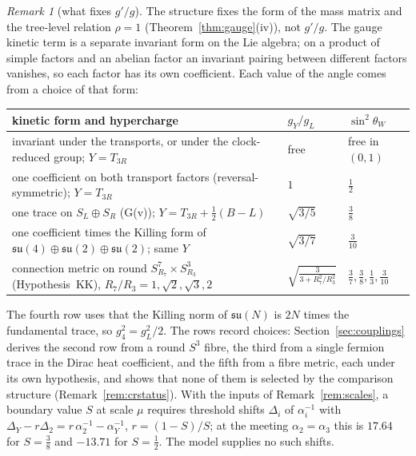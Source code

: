 \documentclass[aps,pra,onecolumn,superscriptaddress,nofootinbib,10pt]{revtex4-2}
\theoremstyle{definition}
\theoremstyle{remark}
\newtheorem{remark}[theorem]{Remark}
\newcommand{\su}{\mathfrak{su}}
\begin{document}
\begin{remark}[what fixes $g'/g$]\label{rem:couplings}
The structure fixes the form of the mass matrix and the tree-level relation $\rho=1$
(Theorem~\ref{thm:gauge}(iv)), not $g'/g$.  The gauge kinetic term is a separate invariant form on the Lie
algebra; on a product of simple factors and an abelian factor an invariant pairing between different
factors vanishes, so each factor has its own coefficient.  Each value of the angle comes from a choice
of that form:
\begin{center}\footnotesize
\begin{tabular}{@{}lll@{}}
\toprule
kinetic form and hypercharge & $g_Y/g_L$ & $\sin^2\theta_W$\\
\midrule
invariant under the transports, or under the clock-reduced group; $Y=T_{3R}$ & free & free in $(0,1)$\\
one coefficient on both transport factors (reversal-symmetric); $Y=T_{3R}$ & $1$ & $\tfrac12$\\
one trace on $S_L\oplus S_R$ (G(v)); $Y=T_{3R}+\tfrac12(B-L)$ & $\sqrt{3/5}$ & $\tfrac38$\\
one coefficient times the Killing form of $\su(4)\oplus\su(2)\oplus\su(2)$; same $Y$ & $\sqrt{3/7}$ & $\tfrac3{10}$\\
connection metric on round $S^7_{R_7}\times S^3_{R_3}$ (Hypothesis~KK), $R_7/R_3=1,\sqrt2,\sqrt3,2$ & $\sqrt{\tfrac{3}{3+R_7^2/R_3^2}}$ & $\tfrac37,\tfrac38,\tfrac13,\tfrac3{10}$\\
\bottomrule
\end{tabular}
\end{center}
The fourth row uses that the Killing norm of $\su(N)$ is $2N$ times the fundamental trace, so $g_4^2=g_L^2/2$.  The
rows record choices: Section~\ref{sec:couplings} derives the second row from a round $S^3$ fibre, the third
from a single fermion trace in the Dirac heat coefficient, and the fifth from a fibre metric, each under its
own hypothesis, and shows that none of them is selected by the comparison structure (Remark~\ref{rem:crstatus}).
With the inputs of Remark~\ref{rem:scales}, a boundary value $S$ at scale $\mu$ requires threshold shifts
$\Delta_i$ of $\alpha_i^{-1}$ with $\Delta_Y-r\Delta_2=r\,\alpha_2^{-1}-\alpha_Y^{-1}$, $r=(1-S)/S$; at the meeting $\alpha_2=\alpha_3$ this is
$17.64$ for $S=\tfrac38$ and $-13.71$ for $S=\tfrac12$.  The model supplies no such shifts.
\end{remark}
\end{document}
